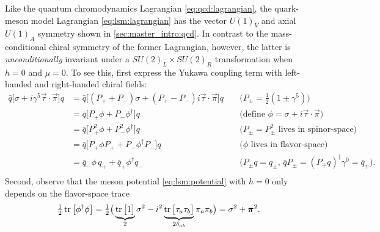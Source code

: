 Like the quantum chromodynamics Lagrangian \eqref{eq:qcd:lagrangian}, the quark-meson model Lagrangian \eqref{eq:lsm:lagrangian} has the vector $U(1)_V$ and axial $U(1)_A$ symmetry shown in \cref{sec:master_intro:qcd}.
In contrast to the mass-conditional chiral symmetry of the former Lagrangian, however, the latter is \emph{unconditionally} invariant under a $SU(2)_L \times SU(2)_R$ transformation when $h=0$ and $\mu = 0$.
To see this, first express the Yukawa coupling term with left-handed and right-handed chiral fields:
\begin{equation}
\begin{aligned}
	\bar{q} \big[\sigma + i \gamma^5 \vec{\tau} \cdot \vec{\pi}\big] q &= \bar{q} \big[ (P_+ + P_-) \sigma + (P_+ - P_-) i \vec{\tau} \cdot \vec{\pi}\big] q && \; \big( P_\pm = \tfrac{1}{2} (1 \pm \gamma^5) \big) \\
	                                                           &= \bar{q} \big[ P_+ \phi + P_- \phi^\dagger\big] q && \; \big( \text{define } \phi=\sigma+i\vec{\tau}\cdot\vec{\pi} \big) \\
	                                                           &= \bar{q} \big[ P_+^2 \phi + P_-^2 \phi^\dagger\big] q && \; \big( \text{$P_\pm=P_\pm^2$ lives in spinor-space} \big) \\
	                                                           &= \bar{q} \big[ P_+ \phi P_+ + P_- \phi^\dagger P_-\big] q && \; \big( \text{$\phi$ lives in flavor-space} \big)\\
	                                                           &= \bar{q}_- \phi \, q_+ + \bar{q}_+ \phi^\dagger q_- && \; \big( \text{$P_\pm q = q_\pm$, $\bar{q} P_\pm = (P_\mp q)^\dagger \gamma^0 = \bar{q}_\mp$} \big).\\
\end{aligned}
\label{eq:lsm:yukawa_symmetry}
\end{equation}
Second, observe that the meson potential \eqref{eq:lsm:potential} with $h=0$ only depends on the flavor-space trace
\begin{equation}
	\tfrac12 \operatorname{tr}\big[\phi^\dagger \phi\big] = \tfrac12 \big( \underbrace{\operatorname{tr}\big[1\big]}_2 \sigma^2 - i^2 \underbrace{\operatorname{tr}\big[\tau_a \tau_b \big]}_{2 \delta_{ab}} \pi_a \pi_b \big) = \sigma^2 + {\bm{\pi}}^2.
\label{eq:lsm:meson_symmetry}
\end{equation}
